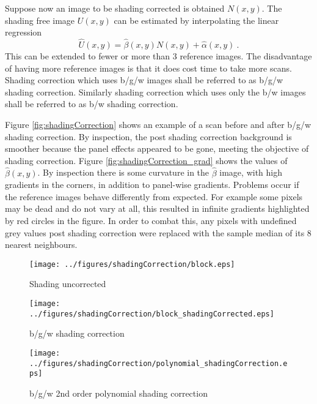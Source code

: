 \documentclass[a4paper]{proc}
\begin{document}
Suppose now an image to be shading corrected is obtained $N(x,y)$. The shading free image $U(x,y)$ can be estimated by interpolating the linear regression
\begin{equation}
\widehat{U}(x,y) = \widehat{\beta}(x,y)N(x,y)+\widehat{\alpha}(x,y) \ .
\end{equation}
This can be extended to fewer or more than 3 reference images. The disadvantage of having more reference images is that it does cost time to take more scans. Shading correction which uses b/g/w images shall be referred to as b/g/w shading correction. Similarly shading correction which uses only the b/w images shall be referred to as b/w shading correction.

Figure \ref{fig:shadingCorrection} shows an example of a scan before and after b/g/w shading correction. By inspection, the post shading correction background is smoother because the panel effects appeared to be gone, meeting the objective of shading correction. Figure \ref{fig:shadingCorrection_grad} shows the values of $\widehat{\beta}(x,y)$. By inspection there is some curvature in the $\widehat{\beta}$ image, with high gradients in the corners, in addition to panel-wise gradients. Problems occur if the reference images behave differently from expected. For example some pixels may be dead and do not vary at all, this resulted in infinite gradients highlighted by red circles in the figure. In order to combat this, any pixels with undefined grey values post shading correction were replaced with the sample median of its 8 nearest neighbours.

\begin{figure*}
	\centering
	\begin{subfigure}{0.45\textwidth}
		\centering
		\texttt{[image: ../figures/shadingCorrection/block.eps]}
		\caption{Shading uncorrected}
	\end{subfigure}
	\begin{subfigure}{0.45\textwidth}
		\centering
		\texttt{[image: ../figures/shadingCorrection/block\_shadingCorrected.eps]}
		\caption{b/g/w shading correction}
	\end{subfigure}
	\begin{subfigure}{0.45\textwidth}
		\texttt{[image: ../figures/shadingCorrection/polynomial\_shadingCorrection.eps]}
		\caption{b/g/w 2nd order polynomial shading correction}
	\end{subfigure}
	\caption{A x-ray CT scan image before and after b/g/w shading correction.}
	\label{fig:shadingCorrection}
\end{figure*}
\end{document}
